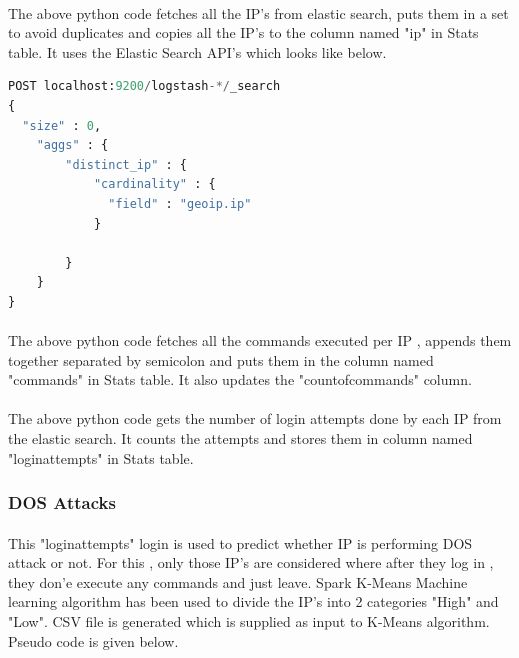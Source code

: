 \documentclass{article}
\begin{document}


\paragraph{}
The above python code fetches all the IP's from elastic search, puts them in a set to avoid duplicates and copies all the IP's to the column named "ip" in Stats table. It uses the Elastic Search API's which looks like below.

\begin{lstlisting}[language=Python, caption=Elastic Search API Request Sample,captionpos=top]
POST localhost:9200/logstash-*/_search
{
  "size" : 0,
    "aggs" : {
        "distinct_ip" : {
            "cardinality" : {
              "field" : "geoip.ip"
            }
          
        }
    }
}
\end{lstlisting}




\paragraph{}
The above python code fetches all the commands executed per IP , appends them together separated by semicolon and puts them in the column named "commands" in Stats table. It also updates the "countofcommands" column.



\paragraph{}
The above python code gets the number of login attempts done by each IP from the elastic search. It counts the attempts and stores them in column named "loginattempts" in Stats table. 

\subsubsection{DOS Attacks}
\paragraph{}
This "loginattempts" login is used to predict whether IP is performing DOS attack or not. For this , only those IP's are considered where after they log in , they don'e execute any commands and just leave. Spark K-Means Machine learning algorithm has been used to divide the IP's into 2 categories "High" and "Low". CSV file is generated  which is supplied as input to K-Means algorithm. Pseudo code is given below.
\end{document}
